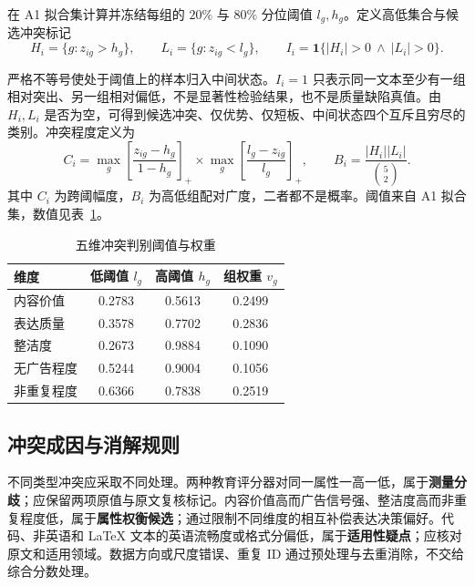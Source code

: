 \documentclass[UTF8,a4paper,12pt]{ctexart}
\begin{document}
在 A1 拟合集计算并冻结每组的 $20\%$ 与 $80\%$ 分位阈值 $l_g,h_g$。定义高低集合与候选冲突标记
\begin{equation}
H_i=\{g:z_{ig}>h_g\},\qquad
L_i=\{g:z_{ig}<l_g\},\qquad
I_i=\mathbf{1}\{|H_i|>0\ \land\ |L_i|>0\}.
\label{eq:q12-conflict}
\end{equation}

严格不等号使处于阈值上的样本归入中间状态。$I_i=1$ 只表示同一文本至少有一组相对突出、另一组相对偏低，不是显著性检验结果，也不是质量缺陷真值。由 $H_i,L_i$ 是否为空，可得到候选冲突、仅优势、仅短板、中间状态四个互斥且穷尽的类别。冲突程度定义为
  \begin{equation}
  C_i=\max_g\left[\frac{z_{ig}-h_g}{1-h_g}\right]_+
    \times\max_g\left[\frac{l_g-z_{ig}}{l_g}\right]_+,
  \qquad
  B_i=\frac{|H_i||L_i|}{\binom{5}{2}}.
\label{eq:q12-strength}
\end{equation}
其中 $C_i$ 为跨阈幅度，$B_i$ 为高低组配对广度，二者都不是概率。阈值来自 A1 拟合集，数值见表~\ref{tab:q12-thresholds}。

\begin{table}[htbp]
\centering
\caption{五维冲突判别阈值与权重}
\label{tab:q12-thresholds}
\begin{tabular}{lccc}
\toprule
维度 & 低阈值 $l_g$ & 高阈值 $h_g$ & 组权重 $v_g$ \\
\midrule
内容价值   & 0.2783 & 0.5613 & 0.2499 \\
表达质量   & 0.3578 & 0.7702 & 0.2836 \\
整洁度     & 0.2673 & 0.9884 & 0.1090 \\
无广告程度 & 0.5244 & 0.9004 & 0.1056 \\
非重复程度 & 0.6366 & 0.7838 & 0.2519 \\
\bottomrule
\end{tabular}
\end{table}

\subsection{冲突成因与消解规则}

不同类型冲突应采取不同处理。两种教育评分器对同一属性一高一低，属于\textbf{测量分歧}；应保留两项原值与原文复核标记。内容价值高而广告信号强、整洁度高而非重复程度低，属于\textbf{属性权衡候选}；通过限制不同维度的相互补偿表达决策偏好。代码、非英语和 LaTeX 文本的英语流畅度或格式分偏低，属于\textbf{适用性疑点}；应核对原文和适用领域。数据方向或尺度错误、重复 ID 通过预处理与去重消除，不交给综合分数处理。
\end{document}
